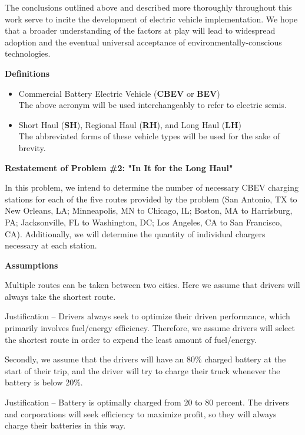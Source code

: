 The conclusions outlined above and described more thoroughly throughout this work serve to incite the development of electric vehicle implementation. We hope that a broader understanding of the factors at play will lead to widespread adoption and the eventual universal acceptance of environmentally-conscious technologies.

\noindent
\textbf{Definitions}
\begin{itemize}
\item \noindent Commercial Battery Electric Vehicle (\textbf{CBEV} or \textbf{BEV})\\
\indent The above acronym will be used interchangeably to refer to electric semis.

\item \noindent Short Haul (\textbf{SH}), Regional Haul (\textbf{RH}), and Long Haul (\textbf{LH})\\
\indent The abbreviated forms of these vehicle types will be used for the sake of brevity.
\end{itemize}

\noindent
\textbf{Restatement of Problem \#2: "In It for the Long Haul"}

In this problem, we intend to determine the number of necessary CBEV charging stations for each of the five routes provided by the problem (San Antonio, TX to New Orleans, LA; Minneapolis, MN to Chicago, IL; Boston, MA to Harrisburg, PA; Jacksonville, FL to Washington, DC; Los Angeles, CA to San Francisco, CA). Additionally, we will determine the quantity of individual chargers necessary at each station. 

\noindent
\textbf{Assumptions}

\begin{assumption}
Multiple routes can be taken between two cities. Here we assume that drivers will always take the shortest route.

Justification – Drivers always seek to optimize their driven performance, which primarily involves fuel/energy efficiency. Therefore, we assume drivers will select the shortest route in order to expend the least amount of fuel/energy.
\end{assumption}

\begin{assumption}
Secondly, we assume that the drivers will have an 80\% charged battery at the start of their trip, and the driver will try to charge their truck whenever the battery is below 20\%.

Justification – Battery is optimally charged from 20 to 80 percent. The drivers and corporations will seek efficiency to maximize profit, so they will always charge their batteries in this way.
\end{assumption}

